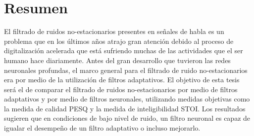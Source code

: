 \section*{\hfil Resumen \hfil}

\noindent El filtrado de ruidos no-estacionarios presentes en señales de habla es un problema que en los últimos años atrajo gran atención debido al proceso de digitalización acelerada que está sufriendo muchas de las actividades que el ser humano hace diariamente. Antes del gran desarrollo que tuvieron las redes neuronales profundas, el marco general para el filtrado de ruido no-estacionarios era por medio de la utilización de filtros adaptativos. El objetivo de esta tesis será el de comparar el filtrado de ruidos no-estacionarios por medio de filtros adaptativos y por medio de filtros neuronales, utilizando medidas objetivas como la medida de calidad PESQ y la medida de inteligibilidad STOI. Los resultados sugieren que en condiciones de bajo nivel de ruido, un filtro neuronal es capaz de igualar el desempeño de un filtro adaptativo o incluso mejorarlo.